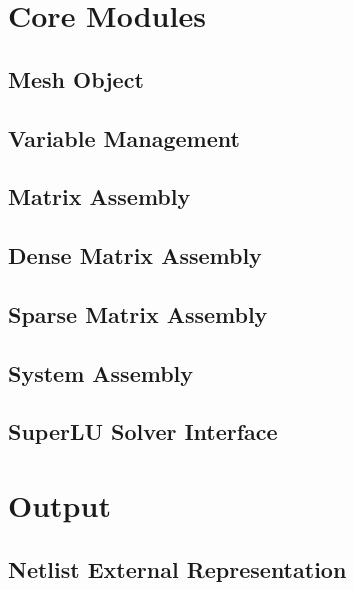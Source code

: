 \documentclass[10pt]{report}
\begin{document}

\tableofcontents
\newpage

\setcounter{page}{1}
\pagestyle{fancy}


\part{Core Modules}

\chapter{Mesh Object}


\chapter{Variable Management}


\chapter{Matrix Assembly}


\chapter{Dense Matrix Assembly}


\chapter{Sparse Matrix Assembly}


\chapter{System Assembly}


\chapter{SuperLU Solver Interface}



\part{Output}

\chapter{Netlist External Representation}

\end{document}

